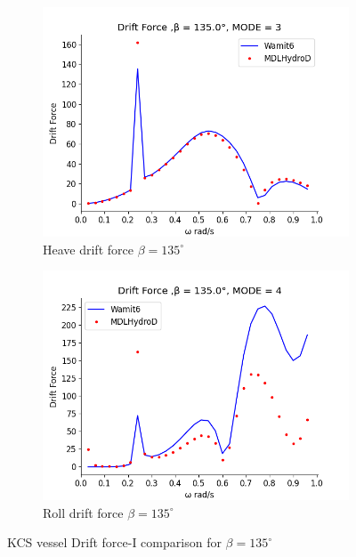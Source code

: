 \begin{figure}[H]
\begin{subfigure}[b]{0.49\textwidth}
        \includegraphics[width=\textwidth]{plots/kcs/drift/DrtFrc_9MODE_3.png}
        \caption{Heave drift force $\beta = 135^{\circ}$}
    \end{subfigure}
    \begin{subfigure}[b]{0.49\textwidth}
        \includegraphics[width=\textwidth]{plots/kcs/drift/DrtFrc_9MODE_4.png}
        \caption{Roll drift force $\beta = 135^{\circ}$}
    \end{subfigure}
    \caption{KCS vessel Drift force-I comparison for $\beta= 135^{\circ}$}
    \label{fig:kcs_drift_135_1}
\end{figure}

